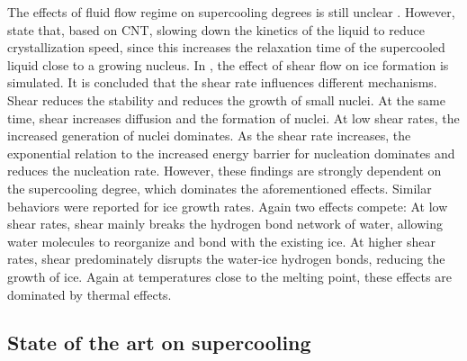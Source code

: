 The effects of fluid flow regime on supercooling degrees is still unclear \citep{kauffeld_ice_2019}. 
However, \cite{ronceray_suppression_2017} state that, based on CNT, slowing down the kinetics of the liquid to reduce crystallization speed, since this increases the relaxation time of the supercooled liquid close to a growing nucleus.
In \cite{Luo_homogeneous_2020,Luo_ice_2019}, the effect of shear flow on ice formation is simulated. It is concluded that the shear rate influences different mechanisms. Shear reduces the stability and reduces the growth of small nuclei. At the same time, shear increases diffusion and the formation of nuclei. At low shear rates, the increased generation of nuclei dominates. As the shear rate increases, the exponential relation to the increased energy barrier for nucleation dominates and reduces the nucleation rate. However, these findings are strongly dependent on the supercooling degree, which dominates the aforementioned effects. Similar behaviors were reported for ice growth rates. Again two effects compete: At low shear rates, shear mainly breaks the hydrogen bond network of water, allowing water molecules to reorganize and bond with the existing ice. At higher shear rates, shear predominately disrupts the water-ice hydrogen bonds, reducing the growth of ice. Again at temperatures close to the melting point, these effects are dominated by thermal effects.







\subsection{State of the art on supercooling}
\label{section_lit_review_supercooling}

